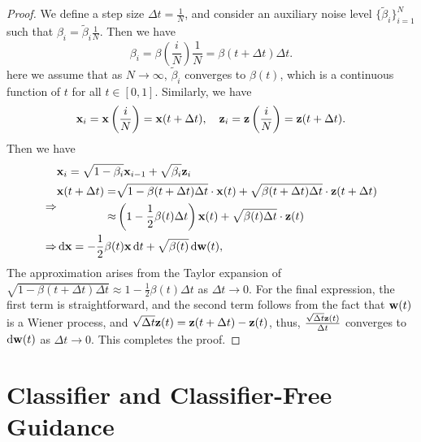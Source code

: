 \begin{proof}
	We define a step size \(\Delta t=\frac{1}{N}\), and consider an auxiliary noise level \(\{\tilde{\beta}_{i}\}_{i=1}^{N}\) such that \(\beta_{i}=\tilde{\beta}_{i}\frac{1}{N}\). Then we have
	\begin{equation*}
		\beta_{i}=\beta\left(\frac{i}{N}\right)\frac{1}{N}=\beta(t+\Delta t)\Delta t.
	\end{equation*}
	here we assume that as \(N\to\infty\), \(\tilde{\beta}_{i}\) converges to \(\beta(t)\), which is a continuous function of \(t\) for all \(t\in[0,1]\). Similarly, we have
	\begin{equation*}
		\mathbf{x}_{i}=\mathbf{x}\left(\frac{i}{N}\right)=\mathbf{x}(t+\Delta t),\quad\mathbf{z}_{i}=\mathbf{z}\left(\frac{i}{N}\right)=\mathbf{z}(t+\Delta t).
	\end{equation*}
	Then we have
	\begin{equation*}
		\begin{aligned}
			            & \mathbf{x}_{i}=\sqrt{1-\beta_{i}}\mathbf{x}_{i-1}+\sqrt{\beta_{i}}\mathbf{z}_{i}                                                                                      \\
			\Rightarrow & \begin{aligned}
				              \mathbf{x}(t+\Delta t)= & \sqrt{1-\beta(t+\Delta t)\Delta t}\cdot\mathbf{x}(t)+\sqrt{\beta(t+\Delta t)\Delta t}\cdot\mathbf{z}(t+\Delta t) \\
				              \approx           & \left(1-\frac{1}{2}\beta(t)\Delta t\right)\mathbf{x}(t)+\sqrt{\beta(t)\Delta t}\cdot\mathbf{z}(t)
			              \end{aligned} \\
			\Rightarrow & \mathop{}\!\mathrm{d}\mathbf{x}=-\frac{1}{2}\beta(t)\mathbf{x}\mathop{}\!\mathrm{d} t+\sqrt{\beta(t)}\mathop{}\!\mathrm{d}\mathbf{w}(t),
		\end{aligned}
	\end{equation*}
	The approximation arises from the Taylor expansion of \(\sqrt{1-\beta(t+\Delta t)\Delta t}\approx 1-\frac{1}{2}\beta(t)\Delta t\) as \(\Delta t\to0\). For the final expression, the first term is straightforward, and the second term follows from the fact that \(\mathbf{w}(t)\) is a Wiener process, and \(\sqrt{\Delta t}\mathbf{z}(t)=\mathbf{z}(t+\Delta t)-\mathbf{z}(t)\), thus, \(\frac{\sqrt{\Delta t}\mathbf{z}(t)}{\Delta t}\) converges to \(\mathop{}\!\mathrm{d}\mathbf{w}(t)\) as \(\Delta t\to0\).
	This completes the proof.
\end{proof}

\section{Classifier and Classifier-Free Guidance}

